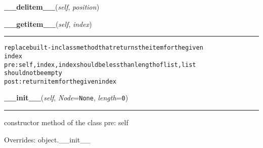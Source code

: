     \label{coinor:blimpy:LinkedList':LinkedList:__delitem__}

    \vspace{0.5ex}

\hspace{.8\funcindent}\begin{boxedminipage}{\funcwidth}

    \raggedright \textbf{\_\_delitem\_\_}(\textit{self}, \textit{position})

\setlength{\parskip}{2ex}
\setlength{\parskip}{1ex}
    \end{boxedminipage}

    \label{coinor:blimpy:LinkedList':LinkedList:__getitem__}

    \vspace{0.5ex}

\hspace{.8\funcindent}\begin{boxedminipage}{\funcwidth}

    \raggedright \textbf{\_\_getitem\_\_}(\textit{self}, \textit{index})

    \vspace{-1.5ex}

    \rule{\textwidth}{0.5\fboxrule}
\setlength{\parskip}{2ex}
\begin{alltt}
replace built-in class method that returns the item for the given
 index
pre: self, index, index should be less than length of list, list
should not be empty
post: return item for the given index
\end{alltt}

\setlength{\parskip}{1ex}
    \end{boxedminipage}

    \vspace{0.5ex}

\hspace{.8\funcindent}\begin{boxedminipage}{\funcwidth}

    \raggedright \textbf{\_\_init\_\_}(\textit{self}, \textit{Node}={\tt None}, \textit{length}={\tt 0})

    \vspace{-1.5ex}

    \rule{\textwidth}{0.5\fboxrule}
\setlength{\parskip}{2ex}
    constructor method of the class pre: self

\setlength{\parskip}{1ex}
      Overrides: object.\_\_init\_\_

    \end{boxedminipage}

